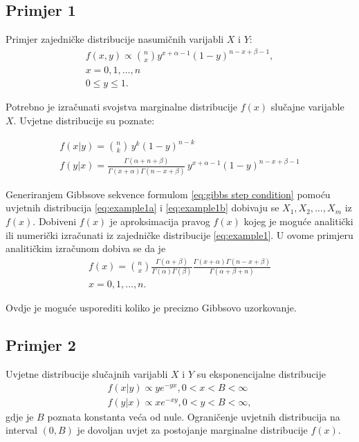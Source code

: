 \subsection{Primjer 1}

Primjer zajedničke distribucije nasumičnih varijabli $X$ i $Y$:
\begin{align} \label{eq:example1}
f(x,y) \propto {n \choose x} y^{x + \alpha - 1}(1-y)^{n - x + \beta - 1}, \nonumber \\
x = 0,1, \dots ,n \nonumber \\
0 \le y \le 1.
\end{align}

Potrebno je izračunati svojstva marginalne distribucije $f(x)$ slučajne varijable $X$. Uvjetne distribucije su poznate:

\begin{subequations} 
\begin{align} 
f(x|y) = {n \choose k}\, y^k (1-y)^{n-k} \label{eq:example1a} \\
f(y|x) = \frac{\Gamma(\alpha+n + \beta)}{\Gamma(x + \alpha)\Gamma(n - x + \beta)}\, y^{x + \alpha-1}(1-y)^{n - x + \beta-1} \label{eq:example1b}
\end{align}
\end{subequations}

Generiranjem Gibbsove sekvence formulom \eqref{eq:gibbs step condition} pomoću uvjetnih distribucija \eqref{eq:example1a} i \eqref{eq:example1b} dobivaju se $X_1, X_2, \dots ,X_m$ iz $f(x)$. Dobiveni $f(x)$ je aproksimacija pravog $f(x)$ kojeg je moguće analitički ili numerički izračunati iz zajedničke distribucije \eqref{eq:example1}. U ovome primjeru analitičkim izračunom dobiva se da je
\begin{align}
f(x) = {n \choose x} \frac{\Gamma(\alpha+\beta)}{\Gamma(\alpha)\Gamma(\beta)}\frac{\Gamma(x+\alpha)\Gamma(n-x+\beta)}{\Gamma(\alpha + \beta +n)} \nonumber \\
x = 0,1, \dots ,n.
\end{align}

Ovdje je moguće usporediti koliko je precizno Gibbsovo uzorkovanje.

\subsection{Primjer 2}

Uvjetne distribucije slučajnih varijabli $X$ i $Y$ su eksponencijalne distribucije
\begin{align}
f(x|y) \propto ye^{-yx}, 0 < x < B < \infty \nonumber \\
f(y|x) \propto xe^{-xy}, 0 < y < B < \infty,
\end{align}
gdje je $B$ poznata konstanta veća od nule. Ograničenje uvjetnih distribucija na interval $(0,B)$ je dovoljan uvjet za postojanje marginalne distribucije $f(x)$. 

